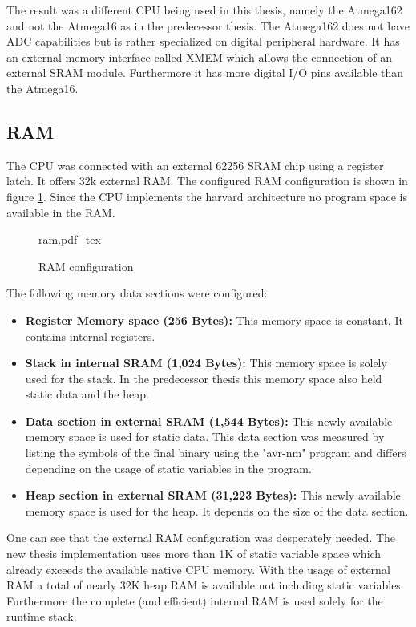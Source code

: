 The result was a different CPU being used in this thesis, namely the Atmega162 and not the Atmega16 as in the predecessor thesis. The Atmega162 does not have ADC capabilities but is rather specialized on digital peripheral hardware. It has an external memory interface called XMEM which allows the connection of an external SRAM module. Furthermore it has more digital I/O pins available than the Atmega16.

\subsection{RAM}%
The CPU was connected with an external 62256 SRAM \cite{62256-datasheet} chip using a register latch. It offers 32k external RAM. The configured RAM configuration is shown in figure \ref{fig:ram}. Since the CPU implements the harvard architecture no program space is available in the RAM.

\begin{figure}[H]
\centering
{ram.pdf_tex}
\caption{RAM configuration}
\label{fig:ram}
\end{figure}

The following memory data sections were configured:

\begin{itemize}
    \item \textbf{Register Memory space (256 Bytes):} This memory space is constant. It contains internal registers.
    \item \textbf{Stack in internal SRAM (1,024 Bytes):} This memory space is solely used for the stack. In the predecessor thesis \cite{korniowski} this memory space also held static data and the heap.
    \item \textbf{Data section in external SRAM (1,544 Bytes):} This newly available memory space is used for static data. This data section was measured by listing the symbols of the final binary using the "avr-nm" program and differs depending on the usage of static variables in the program.
    \item \textbf{Heap section in external SRAM (31,223 Bytes):} This newly available memory space is used for the heap. It depends on the size of the data section.
\end{itemize}

One can see that the external RAM configuration was desperately needed. The new thesis implementation uses more than 1K of static variable space which already exceeds the available native CPU memory. With the usage of external RAM a total of nearly 32K heap RAM is available not including static variables. Furthermore the complete (and efficient) internal RAM is used solely for the runtime stack.

